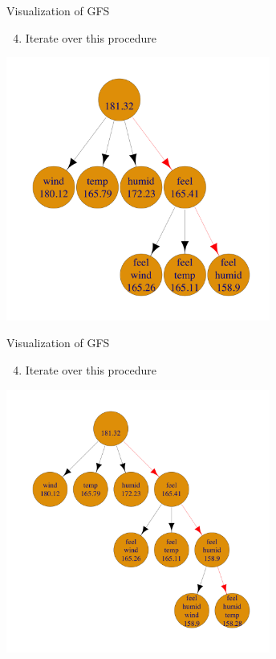 \documentclass[11pt,compress,t,notes=noshow, xcolor=table]{beamer}
\begin{document}
\begin{frame}[noframenumbering]{Visualization of GFS}
\begin{enumerate}
    \setcounter{enumi}{3}
    \item Iterate over this procedure
\end{enumerate}
    \begin{center}
      \includegraphics[width = 0.65\textwidth]{figure/fs-wrappers-powerset-tree-2.png}
      \end{center}
\end{frame}

\begin{frame}[noframenumbering]{Visualization of GFS}
\begin{enumerate}
    \setcounter{enumi}{3}
    \item Iterate over this procedure
\end{enumerate}

    \begin{center}
      \includegraphics[width = 0.65\textwidth]{figure/fs-wrappers-powerset-tree-3.png}
    \end{center}
\end{frame}
\end{document}
